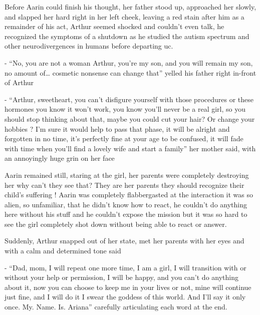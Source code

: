\documentclass[hidelinks,12pt,a4paper]{book}
\begin{document}
Before Aarin could finish his thought, her father stood up, approached her slowly, and slapped her 
hard right in her left cheek, leaving a red stain after him as a remainder of his act, 
Arthur seemed shocked and couldn't even talk, he recognized the symptoms of a shutdown as he studied the 
autism spectrum and other neurodivergences in humans before departing \gls{uc}. \par
\bigskip

- “No, you are not a woman Arthur, you're my son, and you will remain my son, no amount of… 
cosmetic nonsense can change that” yelled his father right in-front of Arthur\newline

- “Arthur, sweetheart, you can't disfigure yourself with those procedures or 
these hormones you know it won't work, you know you'll never be a real girl, so you should stop
 thinking about that, maybe you could cut your hair? Or change your hobbies ? I'm sure it would help to pass that phase, 
 it will be alright and forgotten in no time, it's perfectly fine at your age to be confused, it will fade with
  time when you'll find a lovely wife and start a family” her mother said, with an annoyingly huge grin on her face\par
  \bigskip

Aarin remained still, staring at the girl, her parents were completely destroying her why can't they see that? 
They are her parents they should recognize their child's suffering ! Aarin was completely flabbergasted at the 
interaction it was so alien, so unfamiliar, that he didn't know how to react, he couldn't do anything here without his 
stuff and he couldn't expose the mission but it was so hard to see the girl completely shot down without being able 
to react or answer.\par
\bigskip

Suddenly, Arthur snapped out of her state, met her parents with her eyes and with a calm and determined tone said\newline

- “Dad, mom, I will repeat one more time, I am a girl, I will transition with or without your help or permission, 
I will be happy, and you can't do anything about it, now you can choose to keep me in your lives or not,
 mine will continue just fine, and I will do it I swear the goddess of this world. And I'll say it only once. 
 My. Name. Is. Ariana” carefully articulating each word at the end.\par
 \bigskip
\end{document}
